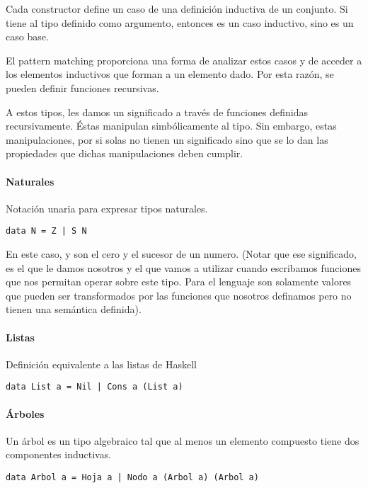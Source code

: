Cada constructor define un caso de una definición inductiva de un conjunto. Si tiene al tipo definido como argumento, entonces es un caso inductivo, sino es un caso base.

El pattern matching proporciona una forma de analizar estos casos y de acceder a los elementos inductivos que forman a un elemento dado. Por esta razón, se pueden definir funciones recursivas.

A estos tipos, les damos un significado a través de funciones definidas recursivamente. Éstas manipulan simbólicamente al tipo. Sin embargo, estas manipulaciones, por si solas no tienen un significado sino que se lo dan las propiedades que dichas manipulaciones deben cumplir.

\paragraph{Naturales} Notación unaria para expresar tipos naturales.
\begin{centrado}
	\begin{verbatim}
data N = Z | S N
	\end{verbatim}
\end{centrado}

En este caso,  y  son el cero y el sucesor de un numero. (Notar que ese significado, es el que le damos nosotros y el que vamos a utilizar cuando escribamos funciones que nos permitan operar sobre este tipo. Para el lenguaje son solamente valores que pueden ser transformados por las funciones que nosotros definamos pero no tienen una semántica definida).

\paragraph{Listas} Definición equivalente a las listas de Haskell
\begin{centrado}
	\begin{verbatim}
data List a = Nil | Cons a (List a)
	\end{verbatim}
\end{centrado}

\paragraph{Árboles}
Un árbol es un tipo algebraico tal que al menos un elemento compuesto tiene dos componentes inductivas.

\begin{centrado}
	\begin{verbatim}
data Arbol a = Hoja a | Nodo a (Arbol a) (Arbol a)
	\end{verbatim}
\end{centrado}

